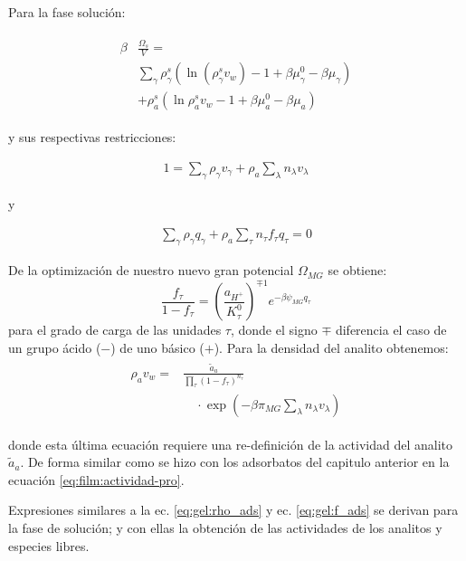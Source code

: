 Para la fase soluci\'on:

\begin{align}
	\begin{aligned}
		\beta&\frac{\Omega_s}{V}=\\& \sum_{\gamma   } {\rho^s_\gamma\left(\ln(\rho_\gamma^sv_w) -1 + \beta\mu_\gamma^0 - \beta\mu_\gamma\right)} \\
		& + \rho^s_a \left( \ln \rho^s_a v_w -1 +\beta\mu^0_a - \beta\mu_a\right)
	\end{aligned}
	\label{eq:gel:bulk-total}
\end{align}

y sus respectivas restricciones:

\begin{align}
	1 = \sum_{\gamma } \rho_\gamma v_\gamma  + \rho_a \sum_\lambda n_\lambda v_\lambda
\end{align}

y 

\begin{align}
	\sum_\gamma \rho_\gamma q_\gamma + \rho_a \sum_\tau n_\tau f_\tau q_\tau = 0
\end{align}



De la optimizaci\'on de nuestro nuevo gran potencial $\Omega_{MG}$  se obtiene:
%
\begin{equation}
\frac{f_\tau}{1-f_\tau}=\left(\frac{a_{H^+}}{K^0_\tau}\right)^{\mp 1} e^{-\beta \psi_{MG} q_\tau}
\label{eq:gel:f_ads}
\end{equation}
%
\noindent para el grado de carga de las unidades $\tau$, donde el signo $\mp$ diferencia el caso de un grupo \'acido ($-$) de uno b\'asico ($+$).
Para la densidad del analito obtenemos:
%
\begin{align}
    \begin{aligned}
   \rho_a v_w =&\frac{ \tilde{a}_a}{\prod_\tau \left(1-f_\tau\right)^{n_\tau}}\\
&\quad \cdot\exp{\left(-\beta \pi_{MG} \sum_\lambda n_\lambda v_\lambda \right)} 
	\label{eq:gel:rho_ads}
    \end{aligned}
\end{align}
%

\noindent donde esta \'ultima ecuaci\'on requiere una re-definici\'on de la actividad del analito $\tilde{a}_a$. De forma similar como se hizo con los adsorbatos del capitulo anterior en la ecuaci\'on \ref{eq:film:actividad-pro}.

Expresiones similares a la ec. \ref{eq:gel:rho_ads} y ec. \ref{eq:gel:f_ads} se derivan para la fase de soluci\'on; y con ellas la obtenci\'on de las actividades  de los analitos y especies libres. 



